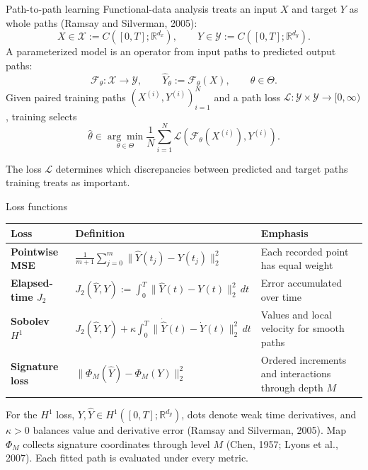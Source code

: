 \documentclass[aspectratio=169,9pt]{beamer}
\newcommand{\Jtwo}{J_2}
\begin{document}
\begin{frame}{Path-to-path learning}
  Functional-data analysis treats an input $X$ and target $Y$ as whole paths (Ramsay and Silverman, 2005):
  \[
    X\in\mathcal X:=C([0,T];\mathbb R^{d_x}),
    \qquad
    Y\in\mathcal Y:=C([0,T];\mathbb R^{d_y}).
  \]
  A parameterized model is an operator from input paths to predicted output paths:
  \[
    \mathcal F_\theta:\mathcal X\to\mathcal Y,
    \qquad
    \widehat Y_\theta:=\mathcal F_\theta(X),
    \qquad \theta\in\Theta.
  \]
  Given paired training paths $(X^{(i)},Y^{(i)})_{i=1}^{N}$ and a path loss $\mathcal L:\mathcal Y\times\mathcal Y\to[0,\infty)$, training selects
  \[
    \widehat\theta\in\underset{\theta\in\Theta}{\arg\min}
    \frac1N\sum_{i=1}^{N}
    \mathcal L\!\left(\mathcal F_\theta(X^{(i)}),Y^{(i)}\right).
  \]

  The loss $\mathcal L$ determines which discrepancies between predicted and target paths training treats as important.
\end{frame}

\begin{frame}{Loss functions}
  \small
  \begin{tabular}{>{\bfseries}p{}p{}p{}}
    \toprule
    Loss & Definition & Emphasis \\
    \midrule
    Pointwise MSE & $\displaystyle \frac1{m+1}\sum_{j=0}^{m}\|\widehat Y(t_j)-Y(t_j)\|_2^2$ & Each recorded point has equal weight \\
    Elapsed-time $\Jtwo$ & $\displaystyle \Jtwo(\widehat Y,Y):=\int_0^T\|\widehat Y(t)-Y(t)\|_2^2\,dt$ & Error accumulated over time \\
    Sobolev $H^1$ & $\displaystyle \Jtwo(\widehat Y,Y)+\kappa\int_0^T\|\dot{\widehat Y}(t)-\dot Y(t)\|_2^2\,dt$ & Values and local velocity for smooth paths \\
    Signature loss & $\displaystyle \|\Phi_M(\widehat Y)-\Phi_M(Y)\|_2^2$ & Ordered increments and interactions through depth $M$ \\
    \bottomrule
  \end{tabular}
  \vfill
  For the $H^1$ loss, $Y,\widehat Y\in H^1([0,T];\mathbb R^{d_y})$, dots denote weak time derivatives, and $\kappa>0$ balances value and derivative error (Ramsay and Silverman, 2005). Map $\Phi_M$ collects signature coordinates through level $M$ (Chen, 1957; Lyons et al., 2007). Each fitted path is evaluated under every metric.
\end{frame}
\end{document}

